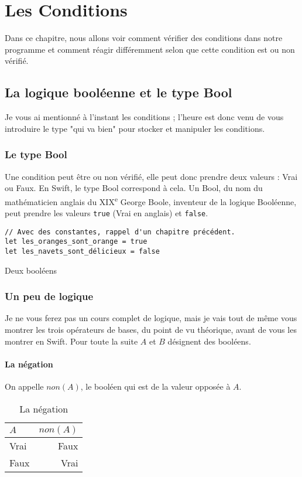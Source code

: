 \chapter{Les Conditions}
Dans ce chapitre, nous allons voir comment vérifier des conditions dans notre programme et
comment réagir différemment selon que cette condition est ou non vérifié.
\section{La logique booléenne et le type Bool}
Je vous ai mentionné à l'instant les conditions ; l'heure est donc venu de vous introduire le
type "qui va bien" pour stocker et manipuler les conditions.
\subsection{Le type Bool}
Une condition peut être ou non vérifié, elle peut donc prendre deux valeurs : Vrai ou Faux.
En Swift, le type Bool correspond à cela. Un Bool, du nom du mathématicien anglais du XIX\textsuperscript{e} George Boole,
inventeur de la logique Booléenne, peut prendre les valeurs \texttt{true} (Vrai en anglais) et \texttt{false}.
\begin{listing}
\begin{verbatim}
// Avec des constantes, rappel d'un chapitre précédent.
let les_oranges_sont_orange = true
let les_navets_sont_délicieux = false
\end{verbatim}
\caption{Deux booléens}
\end{listing}
\subsection{Un peu de logique}
Je ne vous ferez pas un cours complet de logique, mais je vais tout de même vous montrer les trois opérateurs de bases,
du point de vu théorique, avant de vous les montrer en Swift.
Pour toute la suite $A$ et $B$ désignent des booléens.
\subsubsection{La négation}
On appelle $non(A)$, le booléen qui est de la valeur opposée à $A$.
\begin{table}[h]
\centering
\begin{tabu} spread \linewidth {|l|r|}
\hline
$A$ & $non(A)$ \\ \hline
Vrai & Faux \\ \hline
Faux & Vrai \\ \hline
\end{tabu}
\caption{La négation}
\end{table}
